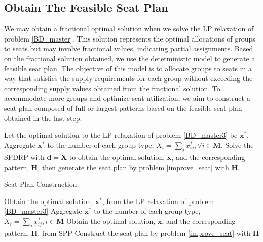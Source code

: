 \subsection{Obtain The Feasible Seat Plan}\label{seat_assignment}
We may obtain a fractional optimal solution when we solve the LP relaxation of problem \eqref{BD_master}. This solution represents the optimal allocations of groups to seats but may involve fractional values, indicating partial assignments. Based on the fractional solution obtained, we use the deterministic model to generate a feasible seat plan. The objective of this model is to allocate groups to seats in a way that satisfies the supply requirements for each group without exceeding the corresponding supply values obtained from the fractional solution. To accommodate more groups and optimize seat utilization, we aim to construct a seat plan composed of full or largest patterns based on the feasible seat plan obtained in the last step. 


Let the optimal solution to the LP relaxation of problem \eqref{BD_master3} be $\mathbf{x}^{*}$. Aggregate $\mathbf{x}^{*}$ to the number of each group type, $\tilde{X}_{i} =\sum_{j} x^{*}_{ij}, \forall i \in \mathbf{M}$. Solve the SPDRP with $\bm{d} = \bm{\tilde{X}}$ to obtain the optimal solution, $\mathbf{\tilde{x}}$, and the corresponding pattern, $\bm{H}$, then generate the seat plan by problem \eqref{improve_seat} with $\bm{H}$.


\begin{algorithm}
  \caption{Seat Plan Construction}\label{seat_construction}
    {Obtain the optimal solution, $\mathbf{x}^{*}$, from the LP relaxation of problem \eqref{BD_master3}\;}
    {Aggregate $\mathbf{x}^{*}$ to the number of each group type, $\tilde{X}_{i} = \sum_{j} x^{*}_{ij}, i \in \mathbf{M}$\;}
    {Obtain the optimal solution, $\tilde{\mathbf{x}}$, and the corresponding pattern, $\bm{H}$, from SPP\;}
    {Construct the seat plan by problem \eqref{improve_seat} with $\bm{H}$\;}
\end{algorithm}
